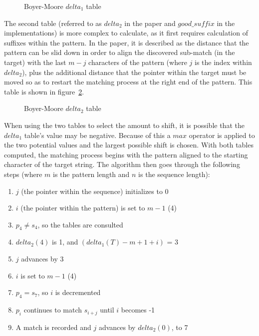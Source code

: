 \begin{figure}[ht]
\centering

\caption{Boyer-Moore $delta_1$ table}
\label{fig:bm_bad_char}
\end{figure}

The second table (referred to as $delta_2$ in the paper and $good\_suffix$ in the implementations) is more complex to calculate, as it first requires calculation of suffixes within the pattern. In the paper, it is described as the distance that the pattern can be slid down in order to align the discovered sub-match (in the target) with the last $m - j$ characters of the pattern (where $j$ is the index within $delta_2$), plus the additional distance that the pointer within the target must be moved so as to restart the matching process at the right end of the pattern. This table is shown in figure~\ref{fig:bm_good_suffix}.

\begin{figure}[ht]
\centering

\caption{Boyer-Moore $delta_2$ table}
\label{fig:bm_good_suffix}
\end{figure}

When using the two tables to select the amount to shift, it is possible that the $delta_1$ table's value may be negative. Because of this a $max$ operator is applied to the two potential values and the largest possible shift is chosen. With both tables computed, the matching process begins with the pattern aligned to the starting character of the target string. The algorithm then goes through the following steps (where $m$ is the pattern length and $n$ is the sequence length):

\begin{enumerate}
\item $j$ (the pointer within the sequence) initializes to 0
\item $i$ (the pointer within the pattern) is set to $m - 1$ (4)
\item $p_4 \neq s_4$, so the tables are consulted
\item $delta_2(4)$ is 1, and $(delta_1(T) - m + 1 + i)$ = 3
\item $j$ advances by 3
\item $i$ is set to $m - 1$ (4)
\item $p_4 = s_7$, so $i$ is decremented
\item $p_i$ continues to match $s_{i+j}$ until $i$ becomes -1
\item A match is recorded and $j$ advances by $delta_2(0)$, to 7
\end{enumerate}

